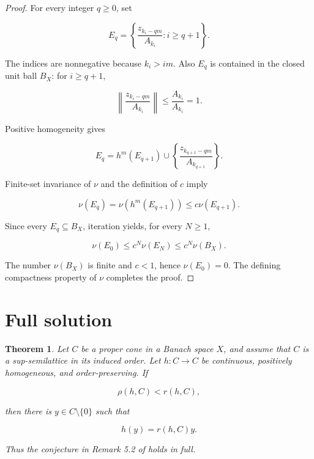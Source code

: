 \documentclass[11pt]{article}
\newtheorem{theorem}{Theorem}
\newcommand{\essrad}{\rho}
\begin{document}
\begin{proof}
For every integer \(q\ge0\), set

\[
 E_q=
 \left\{
   \frac{z_{k_i-qm}}{A_{k_i}}:i\ge q+1
 \right\}.
\]

The indices are nonnegative because \(k_i>im\). Also \(E_q\) is contained
in the closed unit ball \(B_X\): for \(i\ge q+1\),

\[
 \left\|\frac{z_{k_i-qm}}{A_{k_i}}\right\|
 \le \frac{A_{k_i}}{A_{k_i}}=1.
\]

Positive homogeneity gives

\[
 E_q=h^m(E_{q+1})\cup
 \left\{\frac{z_{k_{q+1}-qm}}{A_{k_{q+1}}}\right\}.
\]

Finite-set invariance of \(\nu\) and the definition of \(c\) imply

\[
  \nu(E_q)=\nu(h^m(E_{q+1}))\le c\nu(E_{q+1}).
\]

Since every \(E_q\subseteq B_X\), iteration yields, for every \(N\ge1\),

\[
  \nu(E_0)\le c^N\nu(E_N)\le c^N\nu(B_X).
\]

The number \(\nu(B_X)\) is finite and \(c<1\), hence \(\nu(E_0)=0\).
The defining compactness property of \(\nu\) completes the proof.
\end{proof}

\section{Full solution}

\begin{theorem}\label{thm:main}
Let \(C\) be a proper cone in a Banach space \(X\), and assume that \(C\) is
a sup-semilattice in its induced order. Let \(h:C\to C\) be continuous,
positively homogeneous, and order-preserving. If

\[
  \essrad(h,C)<r(h,C),
\]

then there is \(y\in C\setminus\{0\}\) such that

\[
  h(y)=r(h,C)y.
\]

Thus the conjecture in Remark 5.2 of \cite{AGN} holds in full.
\end{theorem}
\end{document}
